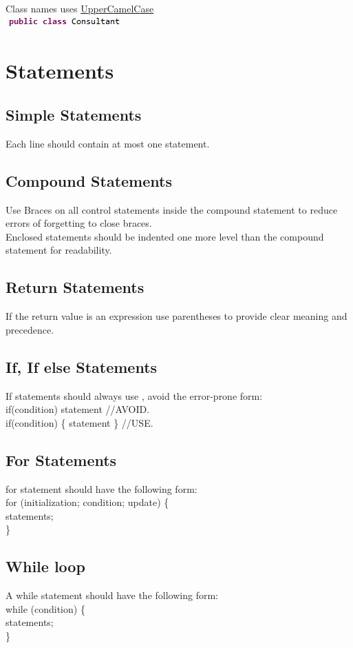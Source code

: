 \documentclass[a4paper,12pt]{report}
\begin{document}
Class names uses \underline{UpperCamelCase}\\
\includegraphics{ClassName}
\section{Statements}
\subsection{Simple Statements}
Each line should contain at most one statement.
\subsection{Compound Statements}
Use Braces on all control statements inside the compound statement to reduce errors of forgetting to close braces.\\
Enclosed statements should be indented one more level than the compound statement for readability.  
\subsection{Return Statements}
If the return value is an expression use parentheses to provide clear meaning and precedence.
\subsection{If, If else Statements}
If statements should always use {}, avoid the error-prone form:\\ if(condition) statement //AVOID.\\
if(condition) \{ statement \} //USE. 
\subsection{For Statements}
for statement should have the following form:\\
for (initialization; condition; update) \{ \\
	\indent statements;\\
\} 
\subsection{While loop}
A while statement should have the following form:\\
while (condition) \{ \\
	\indent statements;\\
\}
\end{document}

